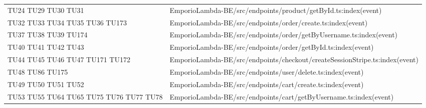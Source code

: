 {\begin{longtable}{C{2cm} C{12.8cm}}
TU24 \newline TU29 \newline TU30 \newline TU31 & EmporioLambda-BE/src/endpoints/product/getById.ts:index(event)\\

TU32 \newline TU33 \newline TU34 \newline TU35 \newline TU36 \newline TU173 & EmporioLambda-BE/src/endpoints/order/create.ts:index(event)\\

TU37 \newline TU38 \newline TU39 \newline TU174 & EmporioLambda-BE/src/endpoints/order/getByUsername.ts:index(event)\\

TU40 \newline TU41 \newline TU42 \newline TU43 & EmporioLambda-BE/src/endpoints/order/getById.ts:index(event)\\

TU44 \newline TU45 \newline TU46 \newline TU47 \newline TU171 \newline TU172 & EmporioLambda-BE/src/endpoints/checkout/createSessionStripe.ts:index(event)\\

TU48 \newline TU86 \newline TU175 & EmporioLambda-BE/src/endpoints/user/delete.ts:index(event)\\

TU49 \newline TU50 \newline TU51 \newline TU52 & EmporioLambda-BE/src/endpoints/cart/create.ts:index(event)\\

TU53 \newline TU55 \newline TU64 \newline TU65 \newline TU75 \newline TU76 \newline TU77 \newline TU78 & EmporioLambda-BE/src/endpoints/cart/getByUsername.ts:index(event)\\


\end{longtable}}
